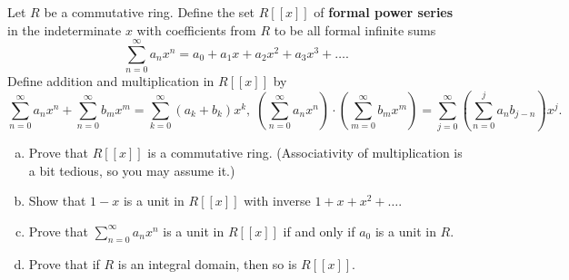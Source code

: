 \documentclass[10pt]{amsart}
\begin{document}
\begin{thm}
  Let $R$ be a commutative ring.
  Define the set $R[[x]]$ of {\bf formal power series} in the indeterminate $x$ with coefficients from $R$ to be all formal infinite sums
  $$\sum_{n=0}^\infty a_nx^n = a_0 + a_1x + a_2 x^2 + a_3x^3 + \ldots.$$
  Define addition and multiplication in $R[[x]]$ by
  $$\sum_{n=0}^\infty a_nx^n + \sum_{n=0}^\infty b_mx^m = \sum_{k=0}^\infty (a_k + b_k)x^k,\; \left(\sum_{n=0}^\infty a_nx^n\right) \cdot \left(\sum_{m=0}^\infty b_mx^m\right) = \sum_{j=0}^\infty\left(\sum_{n=0}^j a_nb_{j-n}\right)x^j.$$
  \begin{enumerate}[(a)]
  \item
    Prove that $R[[x]]$ is a commutative ring.
    (Associativity of multiplication is a bit tedious, so you may assume it.)
  \item
    Show that $1-x$ is a unit in $R[[x]]$ with inverse $1 + x + x^2 + \ldots$.
  \item
    Prove that $\sum_{n=0}^\infty a_nx^n$ is a unit in $R[[x]]$ if and only if $a_0$ is a unit in $R$.
  \item
    Prove that if $R$ is an integral domain, then so is $R[[x]]$.
  \end{enumerate}


\end{thm}
\end{document}
